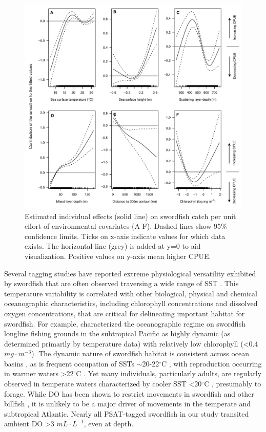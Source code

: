 \begin{figure}[htbp]
\centering
\includegraphics[width=\textwidth]{images/C4_Fig6.pdf}
\caption[Estimated individual effects on swordfish catch per unit effort of environmental covariates in an additive model framework]{Estimated individual effects (solid line) on swordfish catch per unit effort of environmental covariates (A-F). Dashed lines show 95\% confidence limits. Ticks on x-axis indicate values for which data exists. The horizontal line (grey) is added at y=0 to aid visualization. Positive values on y-axis mean higher CPUE.}
\label{fig:c4f6}
\end{figure}

Several tagging studies have reported extreme physiological versatility exhibited by swordfish that are often observed traversing a wide range of SST \citep{Abecassis2012}. This temperature variability is correlated with other biological, physical and chemical oceanographic characteristics, including chlorophyll concentrations and dissolved oxygen concentrations, that are critical for delineating important habitat for swordfish. For example, \citet{Seki2002} characterized the oceanographic regime on swordfish longline fishing grounds in the subtropical Pacific as highly dynamic (as determined primarily by temperature data) with relatively low chlorophyll (<0.4 \(mg \cdot m^{-3}\)). The dynamic nature of swordfish habitat is consistent across ocean basins \citep{Hazin2008, Seki2002, Podesta1993}, as is frequent occupation of SSTs $\sim$20-22$^{\circ}$C \citep{Santos2006}, with reproduction occurring in warmer waters >22$^{\circ}$C \citep{Palko1981, Romeo2011}. Yet many individuals, particularly adults, are regularly observed in temperate waters characterized by cooler SST <20$^{\circ}$C \citep{Evans2014, Abascal2015}, presumably to forage. While DO has been shown to restrict movements in swordfish and other billfish \citep{Stramma2012, Braun2015}, it is unlikely to be a major driver of movements in the temperate and subtropical Atlantic. Nearly all PSAT-tagged swordfish in our study transited ambient DO >3 \(mL \cdot L^{-1}\), even at depth.

